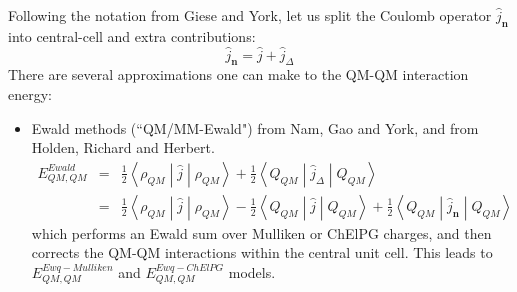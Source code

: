 \documentclass[aip,jcp,preprint,superscriptaddress,amsmath,amssymb]{revtex4-1}
\begin{document}
Following the notation from Giese and York, let us split the Coulomb operator $\hat{j}_ {\mathbf{n}}$ into central-cell and extra contributions: 
\begin{equation}
\hat{j}_ {\mathbf{n}} = \hat{j} + \hat{j}_ {\Delta}
\end{equation}
There are several approximations one can make to the QM-QM interaction energy: 
\begin{itemize}
\item Ewald methods (``QM/MM-Ewald") from Nam, Gao and York, and from Holden, Richard and Herbert.  
\begin{eqnarray}
E_{QM,QM}^{Ewald} & =  &  \frac{1}{2} \left< \rho_{QM}  \middle| \hat{j} \middle| \rho_{QM}  \right>  +  \frac{1}{2}  \left< Q_{QM}  \middle| \hat{j}_ {\Delta} \middle| Q_{QM}   \right>   \nonumber \\
 & = & \frac{1}{2} \left< \rho_{QM}  \middle| \hat{j} \middle| \rho_{QM}  \right>  -   \frac{1}{2} \left< Q_{QM}  \middle| \hat{j} \middle| Q_{QM}  \right>  
 +  \frac{1}{2}  \left< Q_{QM}  \middle| \hat{j}_ {\mathbf{n}} \middle| Q_{QM}   \right> \label{eq:Ewq}  
\end{eqnarray} 
which performs an Ewald sum over Mulliken or  ChElPG charges, and then corrects the QM-QM interactions within the central unit cell.   
This leads to $E_{QM,QM}^{Ewq-Mulliken}$ and $E_{QM,QM}^{Ewq-ChElPG}$ models. 


\end{itemize}
\end{document}
